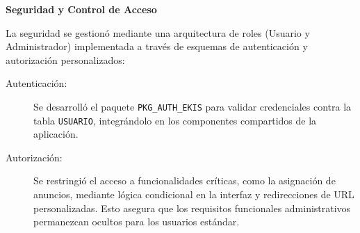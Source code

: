 \textbf{Seguridad y Control de Acceso}

La seguridad se gestionó mediante una arquitectura de roles (Usuario y Administrador) implementada a través de esquemas de autenticación y autorización personalizados:
\begin{description}
    \item[Autenticación:] Se desarrolló el paquete \texttt{PKG\_AUTH\_EKIS} para validar credenciales contra la tabla \texttt{USUARIO}, integrándolo en los componentes compartidos de la aplicación.
    \item[Autorización:] Se restringió el acceso a funcionalidades críticas, como la asignación de anuncios, mediante lógica condicional en la interfaz y redirecciones de URL personalizadas. Esto asegura que los requisitos funcionales administrativos permanezcan ocultos para los usuarios estándar.
\end{description}